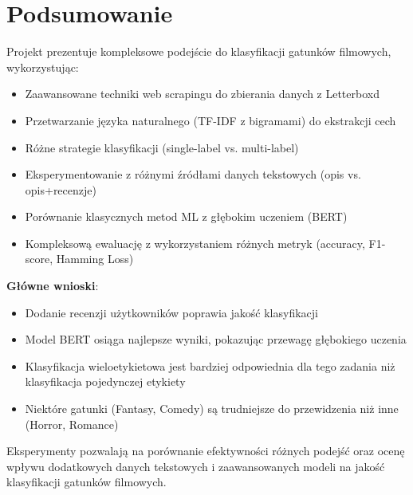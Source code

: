 \documentclass[12pt,a4paper]{article}
\begin{document}
\section{Podsumowanie}

Projekt prezentuje kompleksowe podejście do klasyfikacji gatunków filmowych, wykorzystując:
\begin{itemize}
    \item Zaawansowane techniki web scrapingu do zbierania danych z Letterboxd
    \item Przetwarzanie języka naturalnego (TF-IDF z bigramami) do ekstrakcji cech
    \item Różne strategie klasyfikacji (single-label vs. multi-label)
    \item Eksperymentowanie z różnymi źródłami danych tekstowych (opis vs. opis+recenzje)
    \item Porównanie klasycznych metod ML z głębokim uczeniem (BERT)
    \item Kompleksową ewaluację z wykorzystaniem różnych metryk (accuracy, F1-score, Hamming Loss)
\end{itemize}

\textbf{Główne wnioski}:
\begin{itemize}
    \item Dodanie recenzji użytkowników poprawia jakość klasyfikacji
    \item Model BERT osiąga najlepsze wyniki, pokazując przewagę głębokiego uczenia
    \item Klasyfikacja wieloetykietowa jest bardziej odpowiednia dla tego zadania niż klasyfikacja pojedynczej etykiety
    \item Niektóre gatunki (Fantasy, Comedy) są trudniejsze do przewidzenia niż inne (Horror, Romance)
\end{itemize}

Eksperymenty pozwalają na porównanie efektywności różnych podejść oraz ocenę wpływu dodatkowych danych tekstowych i zaawansowanych modeli na jakość klasyfikacji gatunków filmowych.
\end{document}
